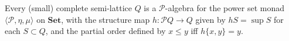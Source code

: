Every (small) complete semi-lattice $Q$ is a $\mathcal{P}$-algebra for the power set monad $\langle \mathcal{P}, \eta, \mu \rangle$ on $\mathbf{Set}$, with the structure map $h : \mathcal{P}Q \to Q$ given by $hS = \sup S$ for each $S \subset Q$, and the partial order defined by $x \leq y$ iff $h\{x, y\} = y$.
